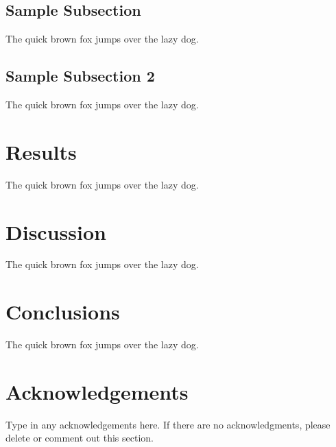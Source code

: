\documentclass[review,authoryear,12pt]{elsarticle}
\begin{document}
\subsection*{Sample Subsection}
The quick brown fox jumps over the lazy dog.

\subsection*{Sample Subsection 2}      
The quick brown fox jumps over the lazy dog.        

\section*{Results}
\label{Results}
The quick brown fox jumps over the lazy dog.

\section*{Discussion}
\label{Discuss}
The quick brown fox jumps over the lazy dog.

\section*{Conclusions}
\label{Conclusions}
The quick brown fox jumps over the lazy dog.

        
\section*{Acknowledgements}
\label{Ack}
Type in any acknowledgements here.  If there are no acknowledgments, please delete or comment out this section.







\end{document}
